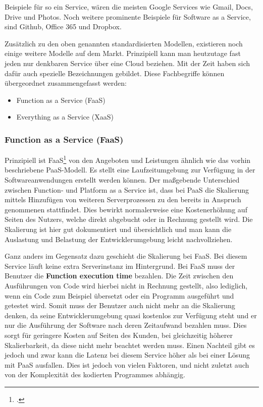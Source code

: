 Beispiele für so ein Service, wären die meisten Google Services wie Gmail, Docs, Drive und Photos. Noch weitere prominente Beispiele für Software as a Service, sind Github, Office 365 und Dropbox.

Zusätzlich zu den oben genannten standardisierten Modellen, existieren noch einige weitere Modelle auf dem Markt. Prinzipiell
kann man heutzutage fast jeden nur denkbaren Service über eine Cloud beziehen.
Mit der Zeit haben sich dafür auch spezielle Bezeichnungen gebildet. Diese Fachbegriffe können übergeordnet zusammengefasst werden:
\begin{itemize}
	\item Function as a Service (FaaS)
	\item Everything as a Service (XaaS)
\end{itemize}

\subsubsection{Function as a Service (FaaS)}
Prinzipiell ist FaaS\footcite{cloud-ms} von den Angeboten und Leistungen ähnlich wie das vorhin beschriebene PaaS-Modell.
Es stellt eine Laufzeitumgebung zur Verfügung in der Softwareanwendungen erstellt werden können.
Der maßgebende Unterschied zwischen Function- und Platform as a Service ist, dass bei PaaS die Skalierung mittels Hinzufügen von weiteren Serverprozessen zu den bereits in Anspruch genommenen stattfindet.
Dies bewirkt normalerweise eine Kostenerhöhung auf Seiten des Nutzers, welche direkt abgebucht oder in Rechnung gestellt wird.
Die Skalierung ist hier gut dokumentiert und übersichtlich und man kann die Auslastung und Belastung der Entwicklerumgebung leicht nachvollziehen.

Ganz anders im Gegensatz dazu geschieht die Skalierung bei FaaS. Bei diesem Service läuft keine extra Serverinstanz im Hintergrund. Bei FaaS muss der Benutzer die \textbf{Function execution time} bezahlen.
Die Zeit zwischen den Ausführungen von Code wird hierbei nicht in Rechnung gestellt, also lediglich, wenn ein Code zum Beispiel übersetzt oder ein Programm ausgeführt und getestet wird.
Somit muss der Benutzer auch nicht mehr an die Skalierung denken, da seine Entwicklerumgebung quasi kostenlos zur Verfügung steht und er nur die Ausführung der Software nach deren Zeitaufwand bezahlen muss.
Dies sorgt für geringere Kosten auf Seiten des Kunden, bei gleichzeitig höherer Skalierbarkeit, da diese nicht mehr beachtet werden muss.
Einen Nachteil gibt es jedoch und zwar kann die Latenz bei diesem Service höher als bei einer Lösung mit PaaS ausfallen.
Dies ist jedoch von vielen Faktoren, und nicht zuletzt auch von der Komplexität des kodierten Programmes abhängig.

